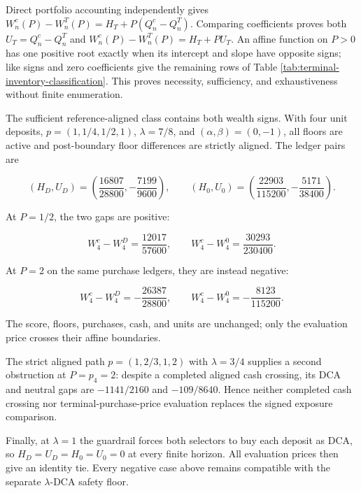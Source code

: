 \documentclass[12pt,a4paper,oneside]{report}
\begin{document}
Direct portfolio accounting independently gives
$W_n^c(P)-W_n^T(P)=H_T+P(Q_n^c-Q_n^T)$. Comparing coefficients proves both
$U_T=Q_n^c-Q_n^T$ and
$W_n^c(P)-W_n^T(P)=H_T+P U_T$. An affine function on $P>0$ has one positive
root exactly when its intercept and slope have opposite signs; like signs and
zero coefficients give the remaining rows of Table
\ref{tab:terminal-inventory-classification}. This proves necessity,
sufficiency, and exhaustiveness without finite enumeration.

The sufficient reference-aligned class contains both wealth signs. With four
unit deposits, $p=(1,1/4,1/2,1)$, $\lambda=7/8$, and
$(\alpha,\beta)=(0,-1)$, all floors are active and post-boundary floor
differences are strictly aligned. The ledger pairs are

\begin{equation}
  (H_D,U_D)=\left(\frac{16807}{28800},-\frac{7199}{9600}\right),
  \qquad
  (H_0,U_0)=\left(\frac{22903}{115200},-\frac{5171}{38400}\right).
  \label{eq:appendix-aligned-win-ledger}
\end{equation}

At $P=1/2$, the two gaps are positive:

\begin{equation}
  W_4^c-W_4^D=\frac{12017}{57600},
  \qquad
  W_4^c-W_4^0=\frac{30293}{230400}.
  \label{eq:affine-strict-wins}
\end{equation}

At $P=2$ on the same purchase ledgers, they are instead negative:

\begin{equation}
  W_4^c-W_4^D=-\frac{26387}{28800},
  \qquad
  W_4^c-W_4^0=-\frac{8123}{115200}.
  \label{eq:affine-strict-losses}
\end{equation}

The score, floors, purchases, cash, and units are unchanged; only the
evaluation price crosses their affine boundaries.

The strict aligned path $p=(1,2/3,1,2)$ with $\lambda=3/4$ supplies a second
obstruction at $P=p_4=2$: despite a completed aligned cash crossing, its DCA
and neutral gaps are $-1141/2160$ and $-109/8640$. Hence neither completed
cash crossing nor terminal-purchase-price evaluation replaces the signed
exposure comparison.

Finally, at $\lambda=1$ the guardrail forces both selectors to buy each deposit
as DCA, so $H_D=U_D=H_0=U_0=0$ at every finite horizon. All evaluation prices
then give an identity tie. Every negative case above remains compatible with
the separate $\lambda$-DCA safety floor.
\end{document}
